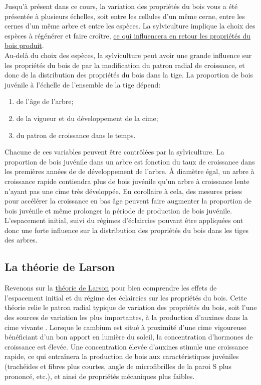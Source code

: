 Jusqu'à présent dans ce cours, la variation des propriétés du bois vous a été présentée à plusieurs échelles, soit entre les cellules d'un même cerne, entre les cernes d'un même arbre et entre les espèces. La sylviculture implique la choix des espèces à régénérer et faire croître, \hyperref[tab:grostab]{ce qui influencera en retour les propriétés du bois produit}.\\

Au-delà du choix des espèces, la sylviculture peut avoir une grande influence sur les propriétés du bois de par la modification du patron radial de croissance, et donc de la distribution des propriétés du bois dans la tige. La proportion de bois juvénile à l'échelle de l'ensemble de la tige dépend:

\begin{enumerate}
	\item de l'âge de l'arbre;
	\item de la vigueur et du développement de la cime;
	\item du patron de croissance dans le temps. 
\end{enumerate}
	
Chacune de ces variables peuvent être contrôlées par la sylviculture. La proportion de bois juvénile dans un arbre est fonction du taux de croissance dans les premières années de de développement de l'arbre. À diamètre égal, un arbre à croissance rapide contiendra plus de bois juvénile qu'un arbre à croissance lente n'ayant pas une cime très développée. En corollaire à cela, des mesures prises pour accélérer la croissance en bas âge peuvent faire augmenter la proportion de bois juvénile et même prolonger la période de production de bois juvénile. L'espacement initial, suivi du régimes d'éclaircies pouvant être appliquées ont donc une forte influence sur la distribution des propriétés du bois dans les tiges des arbres.\\ 
	
\subsection{La théorie de Larson}

Revenons sur la \hyperref[section_auxines]{théorie de Larson} pour bien comprendre les effets de l'espacement initial et du régime des éclaircies sur les propriétés du bois. Cette théorie relie le patron radial typique de variation des propriétés du bois, soit l'une des sources de variation les plus importantes, à la production d'auxines dans la cime vivante \citep{larson1969wood}. Lorsque le cambium est situé à proximité d'une cime vigoureuse bénéficiant d'un bon apport en lumière du soleil, la concentration d'hormones de croissance est élevée. Une concentration élevée d'auxines stimule une croissance rapide, ce qui entraînera la production de bois aux caractéristiques juvéniles (trachéides et fibres plus courtes, angle de microfibrilles de la paroi S plus prononcé, etc.), et ainsi de propriétés mécaniques plus faibles.\\

